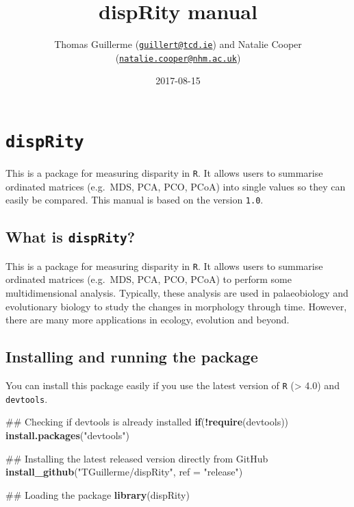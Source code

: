 \documentclass[]{book}
\title{dispRity manual}
\author{Thomas Guillerme
(\href{mailto:guillert@tcd.ie}{\nolinkurl{guillert@tcd.ie}}) and Natalie
Cooper
(\href{mailto:natalie.cooper@nhm.ac.uk}{\nolinkurl{natalie.cooper@nhm.ac.uk}})}
\date{2017-08-15}
\newenvironment{Shaded}{\begin{snugshade}}{\end{snugshade}}
\newcommand{\KeywordTok}[1]{\textcolor[rgb]{0.13,0.29,0.53}{\textbf{#1}}}
\newcommand{\DataTypeTok}[1]{\textcolor[rgb]{0.13,0.29,0.53}{#1}}
\newcommand{\StringTok}[1]{\textcolor[rgb]{0.31,0.60,0.02}{#1}}
\newcommand{\ControlFlowTok}[1]{\textcolor[rgb]{0.13,0.29,0.53}{\textbf{#1}}}
\newcommand{\OperatorTok}[1]{\textcolor[rgb]{0.81,0.36,0.00}{\textbf{#1}}}
\newcommand{\NormalTok}[1]{#1}
\theoremstyle{definition}
\theoremstyle{definition}
\theoremstyle{remark}
\begin{document}
\maketitle

{
\setcounter{tocdepth}{1}
\tableofcontents
}
\chapter{\texorpdfstring{\texttt{dispRity}}{dispRity}}\label{disprity}

This is a package for measuring disparity in \texttt{R}. It allows users
to summarise ordinated matrices (e.g.~MDS, PCA, PCO, PCoA) into single
values so they can easily be compared. This manual is based on the
version \texttt{1.0}.

\section{\texorpdfstring{What is
\texttt{dispRity}?}{What is dispRity?}}\label{what-is-disprity}

This is a package for measuring disparity in \texttt{R}. It allows users
to summarise ordinated matrices (e.g.~MDS, PCA, PCO, PCoA) to perform
some multidimensional analysis. Typically, these analysis are used in
palaeobiology and evolutionary biology to study the changes in
morphology through time. However, there are many more applications in
ecology, evolution and beyond.

\section{Installing and running the
package}\label{installing-and-running-the-package}

You can install this package easily if you use the latest version of
\texttt{R} (\textgreater{} 4.0) and \texttt{devtools}.

\begin{Shaded}
\begin{Highlighting}[]
\NormalTok{## Checking if devtools is already installed}
\ControlFlowTok{if}\NormalTok{(}\OperatorTok{!}\KeywordTok{require}\NormalTok{(devtools)) }\KeywordTok{install.packages}\NormalTok{(}\StringTok{"devtools"}\NormalTok{)}

\NormalTok{## Installing the latest released version directly from GitHub}
\KeywordTok{install_github}\NormalTok{(}\StringTok{"TGuillerme/dispRity"}\NormalTok{, }\DataTypeTok{ref =} \StringTok{"release"}\NormalTok{)}

\NormalTok{## Loading the package}
\KeywordTok{library}\NormalTok{(dispRity)}
\end{Highlighting}
\end{Shaded}
\end{document}
